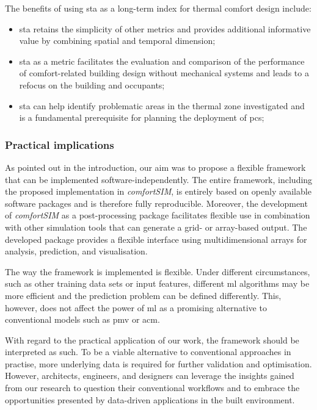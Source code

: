 The benefits of using \gls{sta} as a long-term index for thermal comfort design include:


\begin{itemize}

    \item \gls{sta} retains the simplicity of other metrics and provides additional informative value by combining spatial and temporal dimension;
    
    \item \gls{sta} as a metric facilitates the evaluation and comparison of the performance of comfort-related building design without mechanical systems and leads to a refocus on the building and occupants;
    
    \item \gls{sta} can help identify problematic areas in the thermal zone investigated and is a fundamental prerequisite for planning the deployment of \gls{pcs};

    
\end{itemize}

\subsubsection*{Practical implications}

As pointed out in the introduction, our aim was to propose a flexible framework that can be implemented software-independently. The entire framework, including the proposed implementation in \textit{comfortSIM}, is entirely based on openly available software packages and is therefore fully reproducible. Moreover, the development of \textit{comfortSIM} as a post-processing package facilitates flexible use in combination with other simulation tools that can generate a grid- or array-based output. The developed package provides a flexible interface using multidimensional arrays for analysis, prediction, and visualisation.

The way the framework is implemented is flexible. Under different circumstances, such as other training data sets or input features, different \gls{ml} algorithms may be more efficient and the prediction problem can be defined differently. This, however, does not affect the power of \gls{ml} as a promising alternative to conventional models such as \gls{pmv} or \gls{acm}.

With regard to the practical application of our work, the framework should be interpreted as such. To be a viable alternative to conventional approaches in practise, more underlying data is required for further validation and optimisation. However, architects, engineers, and designers can leverage the insights gained from our research to question their conventional workflows and to embrace the opportunities presented by data-driven applications in the built environment.
